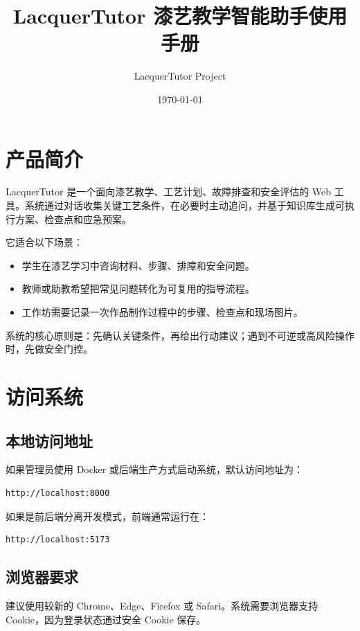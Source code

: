 \documentclass[UTF8,a4paper,12pt]{ctexart}
\title{LacquerTutor 漆艺教学智能助手使用手册}
\author{LacquerTutor Project}
\date{\today}
\begin{document}
\maketitle
\tableofcontents
\newpage

\section{产品简介}

LacquerTutor 是一个面向漆艺教学、工艺计划、故障排查和安全评估的 Web 工具。系统通过对话收集关键工艺条件，在必要时主动追问，并基于知识库生成可执行方案、检查点和应急预案。

它适合以下场景：

\begin{itemize}[leftmargin=2em]
  \item 学生在漆艺学习中咨询材料、步骤、排障和安全问题。
  \item 教师或助教希望把常见问题转化为可复用的指导流程。
  \item 工作坊需要记录一次作品制作过程中的步骤、检查点和现场图片。
\end{itemize}

系统的核心原则是：先确认关键条件，再给出行动建议；遇到不可逆或高风险操作时，先做安全门控。

\section{访问系统}

\subsection{本地访问地址}

如果管理员使用 Docker 或后端生产方式启动系统，默认访问地址为：

\begin{lstlisting}
http://localhost:8000
\end{lstlisting}

如果是前后端分离开发模式，前端通常运行在：

\begin{lstlisting}
http://localhost:5173
\end{lstlisting}

\subsection{浏览器要求}

建议使用较新的 Chrome、Edge、Firefox 或 Safari。系统需要浏览器支持 Cookie，因为登录状态通过安全 Cookie 保存。
\end{document}
